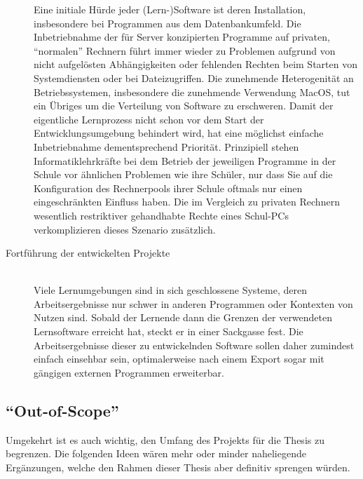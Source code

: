 \begin{description}
  Eine initiale Hürde jeder (Lern-)Software ist deren Installation, insbesondere bei Programmen aus dem Datenbankumfeld. Die Inbetriebnahme der für Server konzipierten Programme auf privaten, ``normalen'' Rechnern führt immer wieder zu Problemen aufgrund von nicht aufgelösten Abhängigkeiten oder fehlenden Rechten beim Starten von Systemdiensten oder bei Dateizugriffen. Die zunehmende Heterogenität an Betriebssystemen, insbesondere die zunehmende Verwendung MacOS, tut ein Übriges um die Verteilung von Software zu erschweren. Damit der eigentliche Lernprozess nicht schon vor dem Start der Entwicklungsumgebung behindert wird, hat eine möglichst einfache Inbetriebnahme dementsprechend Priorität. Prinzipiell stehen Informatiklehrkräfte bei dem Betrieb der jeweiligen Programme in der Schule vor ähnlichen Problemen wie ihre Schüler, nur dass Sie auf die Konfiguration des Rechnerpools ihrer Schule oftmals nur einen eingeschränkten Einfluss haben. Die im Vergleich zu privaten Rechnern wesentlich restriktiver gehandhabte Rechte eines Schul-PCs verkomplizieren dieses Szenario zusätzlich.
\item[Fortführung der entwickelten Projekte] \hfill \\
  Viele Lernumgebungen sind in sich geschlossene Systeme, deren Arbeitsergebnisse nur schwer in anderen Programmen oder Kontexten von Nutzen sind. Sobald der Lernende dann die Grenzen der verwendeten Lernsoftware erreicht hat, steckt er in einer Sackgasse fest. Die Arbeitsergebnisse dieser zu entwickelnden Software sollen daher zumindest einfach einsehbar sein, optimalerweise nach einem Export sogar mit gängigen externen Programmen erweiterbar.
  
  
\end{description}

\subsection{``Out-of-Scope''}
\label{sec:out-of-scope}

Umgekehrt ist es auch wichtig, den Umfang des Projekts für die Thesis zu begrenzen. Die folgenden Ideen wären mehr oder minder naheliegende Ergänzungen, welche den Rahmen dieser Thesis aber definitiv sprengen würden.

